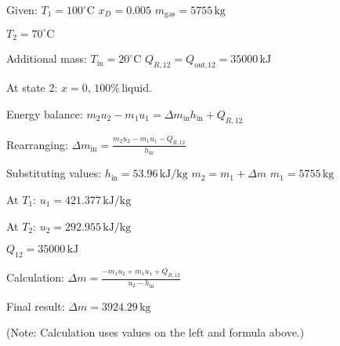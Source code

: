 Given:  
\( T_1 = 100^\circ \text{C} \)  
\( x_D = 0.005 \)  
\( m_{\text{gas}} = 5755 \, \text{kg} \)  

\( T_2 = 70^\circ \text{C} \)  

Additional mass: \( T_{\text{in}} = 20^\circ \text{C} \)  
\( Q_{R,12} = Q_{\text{out,12}} = 35000 \, \text{kJ} \)  

At state 2: \( x = 0 \), \( 100\% \, \text{liquid} \).  

Energy balance:  
\( m_2 u_2 - m_1 u_1 = \Delta m_{\text{in}} h_{\text{in}} + Q_{R,12} \)  

Rearranging:  
\( \Delta m_{\text{in}} = \frac{m_2 u_2 - m_1 u_1 - Q_{R,12}}{h_{\text{in}}} \)  

Substituting values:  
\( h_{\text{in}} = 53.96 \, \text{kJ/kg} \)  
\( m_2 = m_1 + \Delta m \)  
\( m_1 = 5755 \, \text{kg} \)  

At \( T_1 \):  
\( u_1 = 421.377 \, \text{kJ/kg} \)  

At \( T_2 \):  
\( u_2 = 292.955 \, \text{kJ/kg} \)  

\( Q_{12} = 35000 \, \text{kJ} \)  

Calculation:  
\( \Delta m = \frac{-m_1 u_2 + m_1 u_1 + Q_{R,12}}{u_2 - h_{\text{in}}} \)  

Final result:  
\( \Delta m = 3924.29 \, \text{kg} \)  

(Note: Calculation uses values on the left and formula above.)